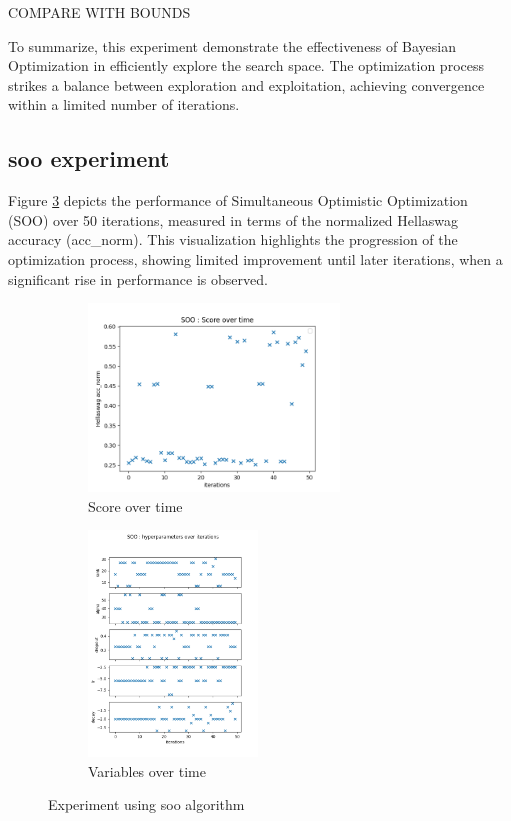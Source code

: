COMPARE WITH BOUNDS


To summarize, this experiment demonstrate the effectiveness of Bayesian Optimization in efficiently explore the search space. The optimization process strikes a balance between exploration and exploitation, achieving convergence within a limited number of iterations.


\subsection{\acrshort{soo} experiment}
\label{sec:soo_exp}
Figure \ref{fig:exp11_res} depicts the performance of Simultaneous Optimistic Optimization (SOO) over 50 iterations, measured in terms of the normalized Hellaswag accuracy (acc\_norm). This visualization highlights the progression of the optimization process, showing limited improvement until later iterations, when a significant rise in performance is observed.

\begin{figure}[h!]
    \centering
    \begin{subfigure}[b]{.45\textwidth}
      \centering
      \includegraphics[height = 5cm]{assets/img/chap_4/experiments/plots/exp10_score_over_time.png}
      \caption{Score over time}
      \label{fig:exp11_score_time}
    \end{subfigure}%
    \begin{subfigure}[b]{.45\textwidth}
      \centering
      \includegraphics[height = 6cm]{assets/img/chap_4/experiments/plots/exp10_variables_over_time.png}
      \caption{Variables over time}
      \label{fig:exp11_var_time}
    \end{subfigure}
    \caption{Experiment using \acrshort{soo} algorithm}
    \label{fig:exp11_res}
\end{figure}

